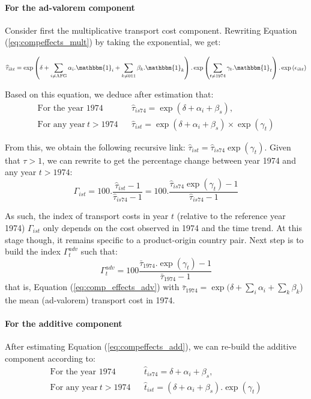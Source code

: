 \documentclass[a4paper,11pt]{article}
\begin{document}
\paragraph{For the ad-valorem component} Consider first the multiplicative transport cost component. Rewriting Equation (\ref{eq:compeffects_mult}) by taking the exponential, we get:

\begin{equation*}
\widehat{\tau}_{ikt}=\exp\left(\delta + \sum_{i \neq \text{AFG}}\alpha_i.\mathbbm{1}_i+\sum_{k\neq \text{011}}\beta_k.\mathbbm{1}_k\right).\exp\left(\sum_{t \neq 1974}\gamma_t.\mathbbm{1}_t\right) .\exp\left(\epsilon_{ikt}\right)
\end{equation*}

Based on this equation, we deduce after estimation that:
\begin{eqnarray*}
\text{For the year 1974}&& \widehat{\tau}_{is74} = \exp(\delta +\alpha_i+\beta_s), \\
\text{For any year}~t> 1974&& \widehat{\tau}_{ist} = \exp(\delta +\alpha_i+\beta_s)\times \exp(\gamma_t)
\end{eqnarray*}

From this, we obtain the following recursive link: $\widehat{\tau}_{ist} = \widehat{\tau}_{is74}\exp(\gamma_t)$. Given that $\tau >1$, we can rewrite to get the percentage change between year 1974 and any year $t>1974$:
\begin{equation*}
\Gamma_{ist} = 100.\frac{\widehat{\tau}_{ist}-1}{\widehat{\tau}_{is74}-1} = 100.\frac{\widehat{\tau}_{is74}\exp(\gamma_t)-1}{\widehat{\tau}_{is74}-1}
\end{equation*}

As such, the index of transport costs in year $t$ (relative to the reference year 1974) $\Gamma_{ist} $  only depends on the cost observed in 1974 and the time trend. At this stage though, it remains specific to a product-origin country pair. Next step is to build the index $\Gamma^{adv}_t$ such that:
\begin{equation}
 \Gamma^{adv}_t= 100\frac {\bar{\tau}_{1974}.\exp(\gamma_t)-1} {\bar{\tau}_{1974}-1}  \label{eq:tcadv_compoeffect}
\end{equation}
\noindent that is, Equation (\ref{eq:comp_effects_adv}) with $\bar{\tau}_{1974} = \exp(\delta + \sum_i \alpha_i + \sum_k \beta_k$) the mean (ad-valorem) transport cost in 1974.

\paragraph{For the additive component} After estimating Equation (\ref{eq:compeffects_add}), we can re-build the additive component according to:
\begin{eqnarray*}
\text{For the year 1974}&&\widehat{t}_{is74}=  \delta + \alpha_i+ \beta_s, \\
\text{For any year}~t> 1974&&\widehat{t}_{ist}=\left(\delta + \alpha_i+ \beta_s\right).\exp(\gamma_t)
\end{eqnarray*}
\end{document}
